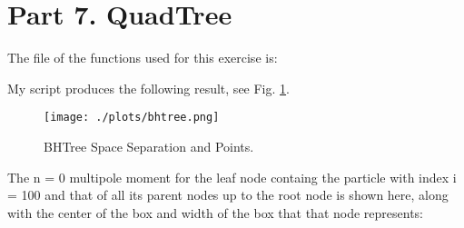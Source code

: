 \section{Part 7. QuadTree}

The file of the functions used for this exercise is:



My script produces the following result, see Fig. \ref{fig:bhtree}.

\begin{figure}[h!]
  \centering
  \texttt{[image: ./plots/bhtree.png]}
  \caption{BHTree Space Separation and Points.}
  \label{fig:bhtree}
\end{figure}

The n = 0 multipole moment for the leaf node containg the particle with index i = 100 and that of
all its parent nodes up to the root node is shown here, along with the center of the box and width of the box that that
node represents:


